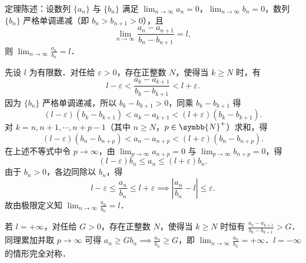 \begin{myproof}
    定理陈述：设数列 $\{a_n\}$ 与 $\{b_n\}$ 满足 $\lim_{n\to\infty} a_n = 0$，$\lim_{n\to\infty} b_n = 0$，数列 $\{b_n\}$ 严格单调递减（即 $b_n > b_{n+1} > 0$），且
    \begin{equation}
        \lim_{n\to\infty} \frac{a_n - a_{n+1}}{b_n - b_{n+1}} = l,
    \end{equation}
    则 $\lim_{n\to\infty} \frac{a_n}{b_n} = l$．

    先设 $l$ 为有限数．对任给 $\varepsilon > 0$，存在正整数 $N$，使得当 $k \geqslant N$ 时，有
    \begin{equation}
        l - \varepsilon < \frac{a_k - a_{k+1}}{b_k - b_{k+1}} < l + \varepsilon.
    \end{equation}
    因为 $\{b_n\}$ 严格单调递减，所以 $b_k - b_{k+1} > 0$，同乘 $b_k - b_{k+1}$ 得
    \begin{equation}
        (l - \varepsilon)(b_k - b_{k+1}) < a_k - a_{k+1} < (l + \varepsilon)(b_k - b_{k+1}).
    \end{equation}
    对 $k = n, n+1, \cdots, n+p-1$（其中 $n \geqslant N$，$p \in \symbb{N}^+$）求和，得
    \begin{equation}
        (l - \varepsilon)(b_n - b_{n+p}) < a_n - a_{n+p} < (l + \varepsilon)(b_n - b_{n+p}).
    \end{equation}
    在上述不等式中令 $p \to \infty$，由 $\lim_{p\to\infty} a_{n+p} = 0$ 与 $\lim_{p\to\infty} b_{n+p} = 0$，得
    \begin{equation}
        (l - \varepsilon) b_n \leqslant a_n \leqslant (l + \varepsilon) b_n.
    \end{equation}
    由于 $b_n > 0$，各边同除以 $b_n$，得
    \begin{equation}
        l - \varepsilon \leqslant \frac{a_n}{b_n} \leqslant l + \varepsilon \implies \left| \frac{a_n}{b_n} - l \right| \leqslant \varepsilon.
    \end{equation}
    故由极限定义知 $\lim_{n\to\infty} \frac{a_n}{b_n} = l$．

    若 $l = +\infty$，对任给 $G > 0$，存在正整数 $N$，使得当 $k \geqslant N$ 时恒有 $\frac{a_k - a_{k+1}}{b_k - b_{k+1}} > G$．同理累加并取 $p \to \infty$ 可得 $a_n \geqslant G b_n \implies \frac{a_n}{b_n} \geqslant G$，即 $\lim_{n\to\infty} \frac{a_n}{b_n} = +\infty$．$l = -\infty$ 的情形完全对称．
\end{myproof}

\endinput
